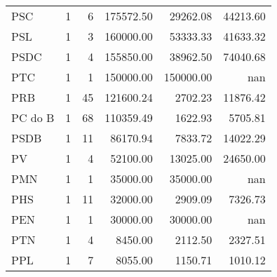 \begin{tabular}{lrrrrr}
PSC     &                    1 &                    6 &   175572.50 &   29262.08 &                 44213.60 \\
PSL     &                    1 &                    3 &   160000.00 &   53333.33 &                 41633.32 \\
PSDC    &                    1 &                    4 &   155850.00 &   38962.50 &                 74040.68 \\
PTC     &                    1 &                    1 &   150000.00 &  150000.00 &                      nan \\
PRB     &                    1 &                   45 &   121600.24 &    2702.23 &                 11876.42 \\
PC do B &                    1 &                   68 &   110359.49 &    1622.93 &                  5705.81 \\
PSDB    &                    1 &                   11 &    86170.94 &    7833.72 &                 14022.29 \\
PV      &                    1 &                    4 &    52100.00 &   13025.00 &                 24650.00 \\
PMN     &                    1 &                    1 &    35000.00 &   35000.00 &                      nan \\
PHS     &                    1 &                   11 &    32000.00 &    2909.09 &                  7326.73 \\
PEN     &                    1 &                    1 &    30000.00 &   30000.00 &                      nan \\
PTN     &                    1 &                    4 &     8450.00 &    2112.50 &                  2327.51 \\
PPL     &                    1 &                    7 &     8055.00 &    1150.71 &                  1010.12 \\
\bottomrule
\end{tabular}
